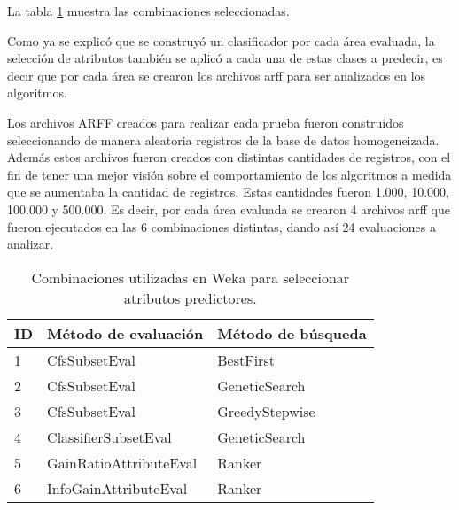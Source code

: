 La tabla \ref{tab:cuadro16} muestra las combinaciones seleccionadas.

Como ya se explicó que se construyó un clasificador por cada área evaluada, la selección de atributos también se aplicó a cada una de estas clases a predecir, es decir que por cada área se crearon los archivos arff para ser analizados en los algoritmos.

Los archivos ARFF creados para realizar cada prueba fueron construidos seleccionando de manera aleatoria registros de la base de datos homogeneizada. Además estos archivos fueron creados con distintas cantidades de registros, con el fin de tener una mejor visión sobre el comportamiento de los algoritmos a medida que se aumentaba la cantidad de registros. Estas cantidades fueron 1.000, 10.000, 100.000 y 500.000. Es decir, por cada área evaluada se crearon 4 archivos arff que fueron ejecutados en las 6 combinaciones distintas, dando así 24 evaluaciones a analizar. 

\begin{table}[!Hhtb]
\centering
\begin{tabular}{|p{1cm}|p{6cm}|p{6cm}|}
\hline
	\rowcolor[gray]{0.9}
	\textbf{ID} &
	\textbf{Método de evaluación} &
	\textbf{Método de búsqueda}\\
\hline
1 & CfsSubsetEval\protect\footnotemark & BestFirst\protect\footnotemark \\ \hline
2 & CfsSubsetEval  & GeneticSearch\protect\footnotemark  \\ \hline
3 & CfsSubsetEval  & GreedyStepwise\protect\footnotemark \\ \hline
4 & ClassifierSubsetEval\protect\footnotemark & GeneticSearch \\ \hline
5 & GainRatioAttributeEval\protect\footnotemark & Ranker\protect\footnotemark \\ \hline
6 & InfoGainAttributeEval\protect\footnotemark & Ranker  \\ \hline
\end{tabular}
\caption{Combinaciones utilizadas en Weka para seleccionar atributos predictores.}
\label{tab:cuadro16}
\end{table}
\addtocounter{footnote}{-7}
\addtocounter{footnote}{1}
\addtocounter{footnote}{1}
\addtocounter{footnote}{1}
\addtocounter{footnote}{1}
\addtocounter{footnote}{1}
\addtocounter{footnote}{1}
\addtocounter{footnote}{1}
